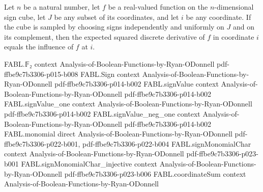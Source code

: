 \begin{theorem}
\label{FABL.expect_sq_discreteDerivative_product}
\leanok
{}
Let $n$ be a natural number, let $f$ be a real-valued function on the $n$-dimensional
sign cube, let $J$ be any subset of its coordinates, and let $i$ be any coordinate. If
the cube is sampled by choosing signs independently and uniformly on $J$ and on its
complement, then the expected squared discrete derivative of $f$ in coordinate $i$
equals the influence of $f$ at $i$.
\end{theorem}

\begin{theorem}
\label{FABL.expect_influence_extendedSignRestriction_of_mem}
\leanok
{}
\proofstep
  {FABL.𝔽₂}
  {context}
  {Analysis-of-Boolean-Functions-by-Ryan-ODonnell}
  {pdf-ffbe9c7b3306-p015-b008}
\proofstep
  {FABL.Sign}
  {context}
  {Analysis-of-Boolean-Functions-by-Ryan-ODonnell}
  {pdf-ffbe9c7b3306-p014-b002}
\proofstep
  {FABL.signValue}
  {context}
  {Analysis-of-Boolean-Functions-by-Ryan-ODonnell}
  {pdf-ffbe9c7b3306-p014-b002}
\proofstep
  {FABL.signValue_one}
  {context}
  {Analysis-of-Boolean-Functions-by-Ryan-ODonnell}
  {pdf-ffbe9c7b3306-p014-b002}
\proofstep
  {FABL.signValue_neg_one}
  {context}
  {Analysis-of-Boolean-Functions-by-Ryan-ODonnell}
  {pdf-ffbe9c7b3306-p014-b002}
\proofstep
  {FABL.monomial}
  {direct}
  {Analysis-of-Boolean-Functions-by-Ryan-ODonnell}
  {pdf-ffbe9c7b3306-p022-b001,
    pdf-ffbe9c7b3306-p022-b004}
\proofstep
  {FABL.signMonomialChar}
  {context}
  {Analysis-of-Boolean-Functions-by-Ryan-ODonnell}
  {pdf-ffbe9c7b3306-p023-b001}
\proofstep
  {FABL.signMonomialChar_injective}
  {context}
  {Analysis-of-Boolean-Functions-by-Ryan-ODonnell}
  {pdf-ffbe9c7b3306-p023-b006}
\proofstep
  {FABL.coordinateSum}
  {context}
  {Analysis-of-Boolean-Functions-by-Ryan-ODonnell}

\end{theorem}
